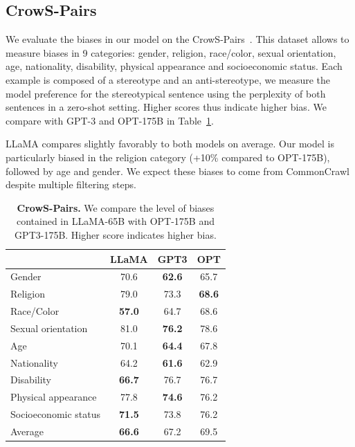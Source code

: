 \documentclass[11pt]{article}
\newcommand{\model}{LLaMA\xspace}%
\begin{document}
\subsection{CrowS-Pairs}

We evaluate the biases in our model on the CrowS-Pairs~\cite{nangia2020crows}.
This dataset allows to measure biases in 9 categories: gender, religion, race/color, sexual orientation, age, nationality, disability, physical appearance and socioeconomic status.
Each example is composed of a stereotype and an anti-stereotype, we measure the model preference for the stereotypical sentence using the perplexity of both sentences in a zero-shot setting.
Higher scores thus indicate higher bias.
We compare with GPT-3 and OPT-175B in Table~\ref{tab:crows}.

\model compares slightly favorably to both models on average.
Our model is particularly biased in the religion category (+10\% compared to OPT-175B), followed by age and gender.
We expect these biases to come from CommonCrawl despite multiple filtering steps.

\begin{table}[t]
  \center
  \setlength{\tabcolsep}{7pt}
  \begin{tabular}{@{}lccc@{}}
  \toprule
  & \model & GPT3 & OPT \\
  \midrule
  Gender & 70.6 & \textbf{62.6} & 65.7 \\
  Religion & 79.0 & 73.3 & \textbf{68.6} \\ 
  Race/Color & \textbf{57.0} & 64.7 & 68.6 \\
  Sexual orientation & 81.0 & \textbf{76.2} & 78.6 \\
  Age & 70.1 & \textbf{64.4} & 67.8 \\
  Nationality & 64.2 & \textbf{61.6} & 62.9 \\
  Disability & \textbf{66.7} & 76.7 & 76.7 \\
  Physical appearance & 77.8 & \textbf{74.6} & 76.2 \\
  Socioeconomic status & \textbf{71.5} & 73.8 & 76.2 \\ \midrule
  Average & \textbf{66.6} & 67.2 & 69.5 \\
  \bottomrule
  \end{tabular}
  \caption{
  \textbf{CrowS-Pairs.} 
  We compare the level of biases contained in \model-65B with OPT-175B and GPT3-175B. Higher score indicates higher bias.
  }
  \vspace{1em}
  \label{tab:crows}
\end{table}
\end{document}
